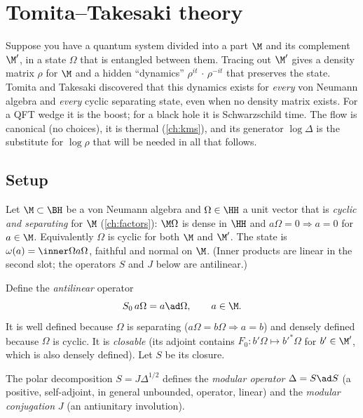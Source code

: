 \chapter{Tomita--Takesaki theory}\label{ch:tomita}

\begin{physmotiv}
Suppose you have a quantum system divided into a part $\M$ and its complement $\M'$, in a state $\Omega$ that is entangled between them. Tracing out $\M'$ gives a density matrix $\rho$ for $\M$ and a hidden ``dynamics'' $\rho^{it}\,\cdot\,\rho^{-it}$ that preserves the state. Tomita and Takesaki discovered that this dynamics exists for \emph{every} von Neumann algebra and \emph{every} cyclic separating state, even when no density matrix exists. For a QFT wedge it is the boost; for a black hole it is Schwarzschild time. The flow is canonical (no choices), it is thermal (\cref{ch:kms}), and its generator $\log\Delta$ is the substitute for $\log\rho$ that will be needed in all that follows.
\end{physmotiv}

\section{Setup}

Let $\M\subset\BH$ be a von Neumann algebra and $\Omega\in\HH$ a unit vector that is \emph{cyclic and separating} for $\M$ (\cref{ch:factors}): $\M\Omega$ is dense in $\HH$ and $a\Omega=0\Rightarrow a=0$ for $a\in\M$. Equivalently $\Omega$ is cyclic for both $\M$ and $\M'$. The state is $\omega(a)=\inner\Omega{a\Omega}$, faithful and normal on $\M$. (Inner products are linear in the second slot; the operators $S$ and $J$ below are antilinear.)

Define the \emph{antilinear} operator
\begin{equation}
S_0\,a\Omega=a\ad\Omega,\qquad a\in\M.
\end{equation}
It is well defined because $\Omega$ is separating ($a\Omega=b\Omega\Rightarrow a=b$) and densely defined because $\Omega$ is cyclic. It is \emph{closable} (its adjoint contains $F_0:b'\Omega\mapsto b'^*\Omega$ for $b'\in\M'$, which is also densely defined). Let $S$ be its closure.

\begin{definition}
The polar decomposition $S=J\Delta^{1/2}$ defines the \emph{modular operator} $\Delta=S\ad S$ (a positive, self-adjoint, in general unbounded, operator, linear) and the \emph{modular conjugation} $J$ (an antiunitary involution).
\end{definition}

